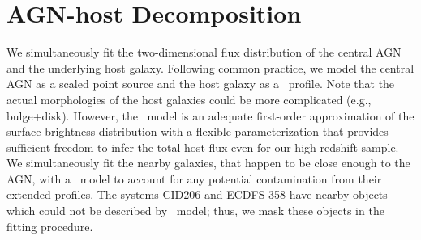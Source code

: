 \documentclass[apj]{emulateapj}
\begin{document}
\section{AGN-host Decomposition}
\label{sec:analysis}
We simultaneously fit the two-dimensional flux distribution of the central AGN and the underlying host galaxy. Following common practice, we model the central AGN as a scaled point source and the host galaxy as a \sersic\ profile. Note that the actual morphologies of the host galaxies could be more complicated (e.g., bulge+disk). However, the \sersic\ model is an adequate first-order approximation of the surface brightness distribution with a flexible parameterization that provides sufficient freedom to infer the total host flux even for our high redshift sample. We simultaneously fit the nearby galaxies, that happen to be close enough to the AGN, with a \sersic\ model to account for any potential contamination from their extended profiles. The systems CID206 and ECDFS-358 have nearby objects which could not be described by \sersic\ model; thus, we mask these objects in the fitting procedure.
\end{document}
